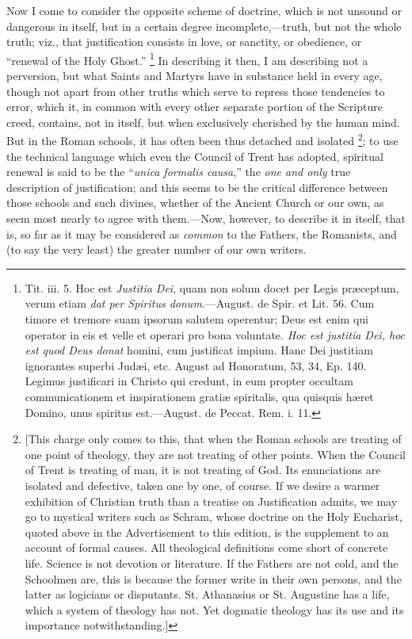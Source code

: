 Now I come to consider the opposite scheme of doctrine, which is
not unsound or dangerous in itself, but in a certain degree incomplete,—truth,
but not the whole truth; viz., that justification consists in love, or
sanctity, or obedience, or ``renewal of the Holy Ghost.'' \footnote{Tit. iii. 5. Hoc est \emph{Justitia Dei}, quam non solum docet
per Legis præceptum, verum etiam \emph{dat per Spiritus donum}.—August.
de Spir. et Lit. 56. Cum timore et tremore suam ipsorum salutem
operentur; Deus est enim qui operator in eis et velle et operari pro
bona voluntate. \emph{Hoc est justitia Dei, hoc est quod Deus donat} homini, cum justificat
impium. Hanc Dei justitiam ignorantes superbi Judæi, etc. August ad
Honoratum, 53, 34, Ep. 140. Legimus justificari in Christo qui credunt,
in eum propter occultam communicationem et inspirationem gratiæ
spiritalis, qua quisquis hæret Domino, unus spiritus est.—August.
de Peccat. Rem. i. 11.} In describing it then, I am describing not a perversion, but what Saints and Martyrs have in substance held in every age,
though not apart from other truths which serve to repress those
tendencies to error, which it, in common with every other separate
portion of the Scripture creed, contains, not in itself, but when
exclusively cherished by the human mind. But in the Roman schools, it
has often been thus detached and isolated \footnote{[This charge
only comes to this, that when the Roman schools are treating of one
point of theology, they are not treating of other points. When the
Council of Trent is treating of man, it is not treating of God. Its
enunciations are isolated and defective, taken one by one, of course.
If we desire a warmer exhibition of Christian truth than a treatise on
Justification admits, we may go to mystical writers such as Schram,
whose doctrine on the Holy Eucharist, quoted above in the
Advertisement to this edition, is the supplement to an account of
formal causes. All theological definitions come short of concrete
life. Science is not devotion or literature. If the Fathers are not
cold, and the Schoolmen are, this is because the former write in their
own persons, and the latter as logicians or disputants. St. Athanasius
or St. Augustine has a life, which a system of theology has not. Yet
dogmatic theology has its use and its importance notwithstanding.]}; to use the technical language which even the Council of Trent
has adopted, spiritual renewal is said to be the ``\emph{unica
formalis causa},'' the \emph{one and only} true description of
justification; and this seems to be the critical difference between
those schools and such divines, whether of the Ancient Church or our
own, as seem most nearly to agree with them.—Now, however, to
describe it in itself, that is, so far as it may be considered as
\emph{common} to the Fathers, the Romanists, and (to say the very
least) the greater number of our own writers.

